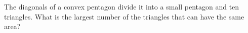 The diagonals of a convex pentagon divide it into a small pentagon and ten triangles. What is the largest number of the triangles that can have the same area?